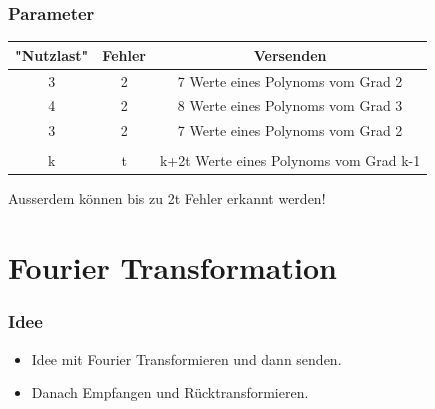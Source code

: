 \documentclass[11pt,aspectratio=169]{beamer}
\begin{document}
	\begin{frame}
	\frametitle{Parameter}
	\begin{center}
		\begin{tabular}{ c c c } 
			\hline
			"Nutzlast" & Fehler & Versenden \\
			\hline 
			3 & 2 & 7 Werte eines Polynoms vom Grad 2 \\ 
			4 & 2 & 8 Werte eines Polynoms vom Grad 3 \\ 
			3 & 2 & 7 Werte eines Polynoms vom Grad 2 \\ 
			&&\\
			k & t & k+2t Werte eines Polynoms vom Grad k-1 \\ 
			\hline
		\end{tabular}
	\end{center}

	Ausserdem können bis zu 2t Fehler erkannt werden!
	\end{frame}
\section{Fourier Transformation}
	\begin{frame}
		\frametitle{Idee}
		\begin{itemize}
			\item Idee mit Fourier Transformieren und dann senden.
			\item Danach Empfangen und Rücktransformieren.
		\end{itemize}
	\end{frame}
\end{document}
